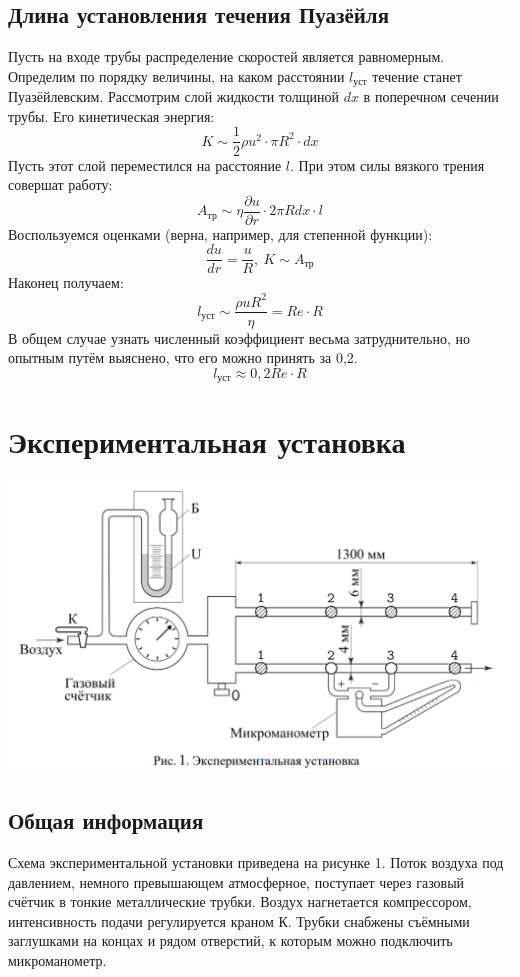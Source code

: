 \documentclass[15pt,a5paper,reqno]{article}
\begin{document}
    \subsection{Длина установления течения Пуазёйля}
    Пусть на входе трубы распределение скоростей является равномерным. Определим по порядку величины, на каком расстоянии $l_{уст}$ течение станет Пуазёйлевским. Рассмотрим слой жидкости толщиной $dx$ в поперечном сечении трубы. Его кинетическая энергия:
    \[K \sim \frac{1}{2}\rho u^2\cdot \pi R^2\cdot dx\]
    Пусть этот слой переместился на расстояние $l$. При этом силы вязкого трения совершат работу:
    \[A_{\text{тр}} \sim \eta\frac{\partial u}{\partial r}\cdot 2\pi Rdx\cdot l\]
    Воспользуемся оценками (верна, например, для степенной функции):
    \[\frac{du}{dr} = \frac{u}{R},\ K \sim A_{\text{тр}}\]
    Наконец получаем:
    \[l_{\text{уст}} \sim \frac{\rho uR^2}{\eta} = Re\cdot R\]
    В общем случае узнать численный коэффициент весьма затруднительно, но опытным путём выяснено, что его можно принять за 0,2.
    \begin{equation}\label{length}
        \boxed{l_{\text{уст}} \approx 0,2Re\cdot R}
    \end{equation}
    
\section{Экспериментальная установка}

    \begin{center}
        \includegraphics[width = \textwidth]{Рисунок 1.png}
    \end{center}
    
    \subsection{Общая информация}
    Схема экспериментальной установки приведена на рисунке 1. Поток воздуха под давлением, немного превышающем атмосферное, поступает через газовый счётчик в тонкие металлические трубки. Воздух нагнетается компрессором, интенсивность подачи регулируется краном К. Трубки снабжены съёмными заглушками на концах и рядом отверстий, к которым можно подключить микроманометр.
    
\end{document}
